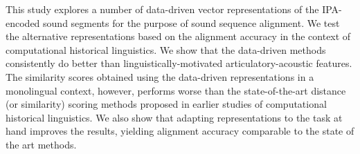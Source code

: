 This study explores a number of data-driven vector representations of the IPA-encoded sound segments for the purpose of sound sequence alignment.  We test the alternative representations based on the alignment accuracy in the context of computational historical linguistics.  We show that the data-driven methods consistently do better than linguistically-motivated articulatory-acoustic features.  The similarity scores obtained using the data-driven representations in a monolingual context, however, performs worse than the state-of-the-art distance (or similarity) scoring methods proposed in earlier studies of computational historical linguistics.  We also show that adapting representations to the task at hand improves the results, yielding alignment accuracy comparable to the state of the art methods.
